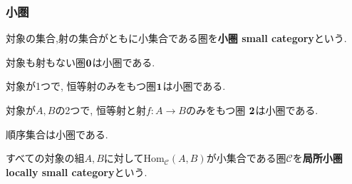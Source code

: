 \subsubsection{小圏}
\begin{Def}
対象の集合,射の集合がともに小集合である圏を{\bf 小圏 small category}という.
\end{Def}
\begin{Prop}
対象も射もない圏${\bf 0}$は小圏である.
\end{Prop}
\begin{Prop}
対象が1つで, 恒等射のみをもつ圏${\bf 1}$は小圏である.
\end{Prop}
\begin{Prop}
対象が$A,B$の2つで, 
恒等射と射$f:A\rightarrow B$のみをもつ圏
${\bf 2}$は小圏である.
\end{Prop}
\begin{Prop}
順序集合は小圏である.
\end{Prop}
\begin{Def}
すべての対象の組$A,B$に対して$\mathrm{Hom}_{\mathscr{C}}(A,B)$が小集合である圏$\mathscr{C}$を{\bf 局所小圏 locally small category}という.
\end{Def}
